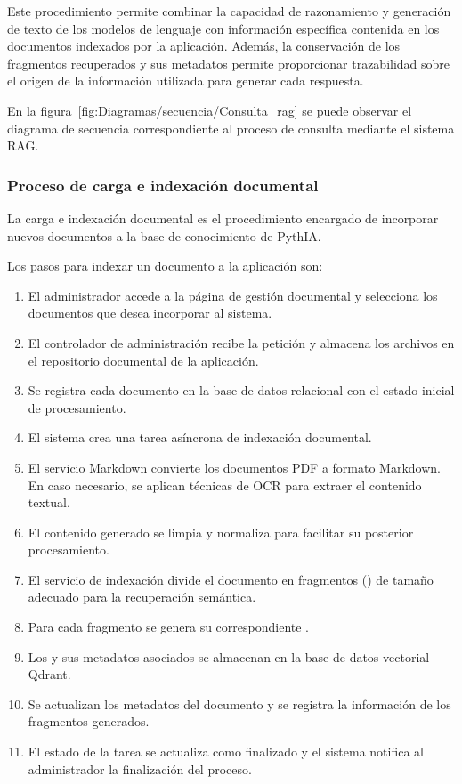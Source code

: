Este procedimiento permite combinar la capacidad de razonamiento y generación de texto de los modelos de lenguaje con información específica contenida en los documentos indexados por la aplicación. Además, la conservación de los fragmentos recuperados y sus metadatos permite proporcionar trazabilidad sobre el origen de la información utilizada para generar cada respuesta.

En la figura~\ref{fig:Diagramas/secuencia/Consulta_rag} se puede observar el diagrama de secuencia correspondiente al proceso de consulta mediante el sistema RAG.


\subsubsection{Proceso de carga e indexación documental}

La carga e indexación documental es el procedimiento encargado de incorporar nuevos documentos a la base de conocimiento de PythIA.

Los pasos para indexar un documento a la aplicación son:
\begin{enumerate}
	\item El administrador accede a la página de gestión documental y selecciona los documentos que desea incorporar al sistema.
	\item El controlador de administración recibe la petición y almacena los archivos en el repositorio documental de la aplicación.
	\item Se registra cada documento en la base de datos relacional con el estado inicial de procesamiento.
	\item El sistema crea una tarea asíncrona de indexación documental.
	\item El servicio Markdown convierte los documentos PDF a formato Markdown. En caso necesario, se aplican técnicas de OCR para extraer el contenido textual.
	\item El contenido generado se limpia y normaliza para facilitar su posterior procesamiento.
	\item El servicio de indexación divide el documento en fragmentos () de tamaño adecuado para la recuperación semántica.
	\item Para cada fragmento se genera su correspondiente .
	\item Los  y sus metadatos asociados se almacenan en la base de datos vectorial Qdrant.
	\item Se actualizan los metadatos del documento y se registra la información de los fragmentos generados.
	\item El estado de la tarea se actualiza como finalizado y el sistema notifica al administrador la finalización del proceso.
\end{enumerate}

